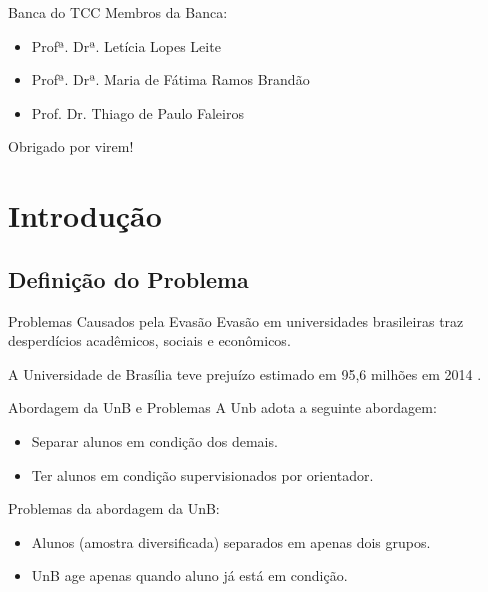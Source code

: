 \begin{frame}{Banca do TCC}
    Membros da Banca: 
    \begin{itemize}
        \item Profª. Drª. Letícia Lopes Leite
        \item Profª. Drª. Maria de Fátima Ramos Brandão
        \item Prof. Dr. Thiago de Paulo Faleiros
    \end{itemize}
    \vspace{0.5cm}
    Obrigado por virem!
\end{frame}

\section{Introdução}
\subsection{Definição do Problema}
\begin{frame}{Problemas Causados pela Evasão}
    Evasão em universidades brasileiras traz desperdícios acadêmicos, sociais e
    econômicos.  

    \vspace{0.5cm}

    A Universidade de Brasília teve prejuízo estimado em 95,6 milhões em 2014
    \cite{correio}.
\end{frame}

\begin{frame}{Abordagem da UnB e Problemas}
    A Unb adota a seguinte abordagem: 
    \begin{itemize}
        \item Separar alunos em condição dos demais.
        \item Ter alunos em condição supervisionados por orientador. 
    \end{itemize}

    \vspace{0.5cm}

    Problemas da abordagem da UnB: 
    \begin{itemize}
        \item Alunos (amostra diversificada) separados em apenas dois grupos.
        \item UnB age apenas quando aluno já está em condição.
    \end{itemize}
\end{frame}

